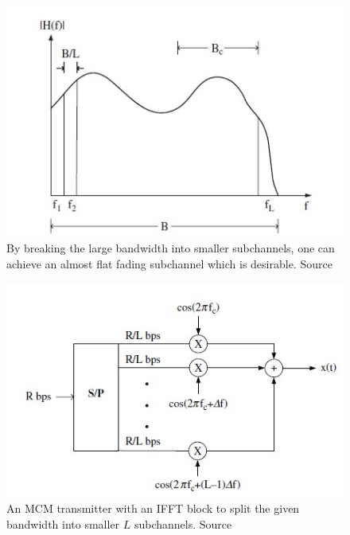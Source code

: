 \begin{figure}[!htbp]
\centering
\includegraphics[scale=1]{Chapter 2/Figures/Flat Fading Subchannel}
\caption[Flat Fading Subchannel]{By breaking the large bandwidth into smaller subchannels, one can achieve an almost flat fading subchannel which is desirable. Source \textcite{Ghosh2010}}
\label{fig:flat fading subchannel}
\end{figure}

\begin{figure}[!htbp]
\centering
\includegraphics[scale=1]{Chapter 2/Figures/MCM Transmitter}
\caption[MCM Transmitter]{An MCM transmitter with an IFFT block to split the given bandwidth into smaller $L$ subchannels. Source \textcite{Ghosh2010}}
\label{fig:mcm transmitter}
\end{figure}

